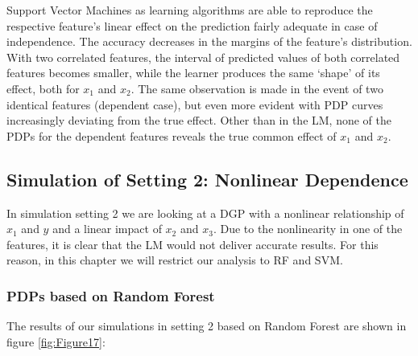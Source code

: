 \documentclass[]{krantz}
\begin{document}
Support Vector Machines as learning algorithms are able to reproduce the
respective feature's linear effect on the prediction fairly adequate in
case of independence. The accuracy decreases in the margins of the
feature's distribution. With two correlated features, the interval of
predicted values of both correlated features becomes smaller, while the
learner produces the same `shape' of its effect, both for \(x_1\) and
\(x_2\). The same observation is made in the event of two identical
features (dependent case), but even more evident with PDP curves
increasingly deviating from the true effect. Other than in the LM, none
of the PDPs for the dependent features reveals the true common effect of
\(x_1\) and \(x_2\).

\subsection{Simulation of Setting 2: Nonlinear
Dependence}\label{simulation-of-setting-2-nonlinear-dependence}

In simulation setting 2 we are looking at a DGP with a nonlinear
relationship of \(x_1\) and \(y\) and a linear impact of \(x_2\) and
\(x_3\). Due to the nonlinearity in one of the features, it is clear
that the LM would not deliver accurate results. For this reason, in this
chapter we will restrict our analysis to RF and SVM.

\subsubsection{PDPs based on Random
Forest}\label{pdps-based-on-random-forest-1}

The results of our simulations in setting 2 based on Random Forest are
shown in figure \ref{fig:Figure17}:
\end{document}
